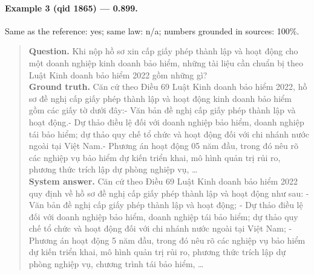 \paragraph{Example 3 (qid 1865) --- \rl{} 0.899.} Same \dieu{} as the reference: yes; same law: n/a; numbers grounded in sources: 100\%.
\begin{quote}\small\textbf{Question.} Khi nộp hồ sơ xin cấp giấy phép thành lập và hoạt động cho một doanh nghiệp kinh doanh bảo hiểm, những tài liệu cần chuẩn bị theo Luật Kinh doanh bảo hiểm 2022 gồm những gì?\\[2pt]
\textbf{Ground truth.} Căn cứ theo Điều 69 Luật Kinh doanh bảo hiểm 2022, hồ sơ đề nghị cấp giấy phép thành lập và hoạt động kinh doanh bảo hiểm gồm các giấy tờ dưới đây:- Văn bản đề nghị cấp giấy phép thành lập và hoạt động.- Dự thảo điều lệ đối với doanh nghiệp bảo hiểm, doanh nghiệp tái bảo hiểm; dự thảo quy chế tổ chức và hoạt động đối với chi nhánh nước ngoài tại Việt Nam.- Phương án hoạt động 05 năm đầu, trong đó nêu rõ các nghiệp vụ bảo hiểm dự kiến triển khai, mô hình quản trị rủi ro, phương thức trích lập dự phòng nghiệp vụ, …\\[2pt]
\textbf{System answer.} Căn cứ theo Điều 69 Luật Kinh doanh bảo hiểm 2022 quy định về hồ sơ đề nghị cấp giấy phép thành lập và hoạt động như sau: - Văn bản đề nghị cấp giấy phép thành lập và hoạt động; - Dự thảo điều lệ đối với doanh nghiệp bảo hiểm, doanh nghiệp tái bảo hiểm; dự thảo quy chế tổ chức và hoạt động đối với chi nhánh nước ngoài tại Việt Nam; - Phương án hoạt động 5 năm đầu, trong đó nêu rõ các nghiệp vụ bảo hiểm dự kiến triển khai, mô hình quản trị rủi ro, phương thức trích lập dự phòng nghiệp vụ, chương trình tái bảo hiểm, …\end{quote}


